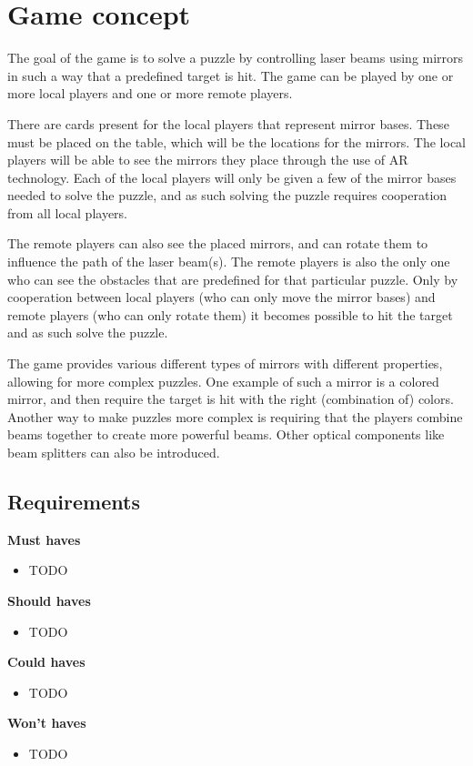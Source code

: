 \section{Game concept}

The goal of the game is to solve a puzzle by controlling laser beams using mirrors
in such a way that a predefined target is hit. The game can be played by 
one or more local players and one or more remote players.

There are cards present for the local players that represent mirror bases. These 
must be placed on the table, which will be the locations for the mirrors. The local
players will be able to see the mirrors they place through the use of AR technology.
Each of the local players will only be given a few of the mirror bases needed to solve
the puzzle, and as such solving the puzzle requires cooperation from all local players.

The remote players can also see the placed mirrors, and can rotate them to influence 
the path of the laser beam(s). The remote players is also the only one who can see the
obstacles that are predefined for that particular puzzle. Only by cooperation between 
local players (who can only move the mirror bases) and remote players (who can only 
rotate them) it becomes possible to hit the target and as such solve the puzzle.

The game provides various different types of mirrors with different properties, 
allowing for more complex puzzles. One example of such a mirror is a colored mirror, 
and then require the target is hit with the right (combination of) colors. Another 
way to make puzzles more complex is requiring that the players combine beams together
to create more powerful beams. Other optical components like beam splitters can
also be introduced.

\subsection{Requirements}

\textbf{Must haves}

\begin{itemize}
	\item TODO
\end{itemize}

\textbf{Should haves}

\begin{itemize}
	\item TODO
\end{itemize}

\textbf{Could haves}

\begin{itemize}
	\item TODO
\end{itemize}

\textbf{Won't haves}

\begin{itemize}
	\item TODO
\end{itemize}